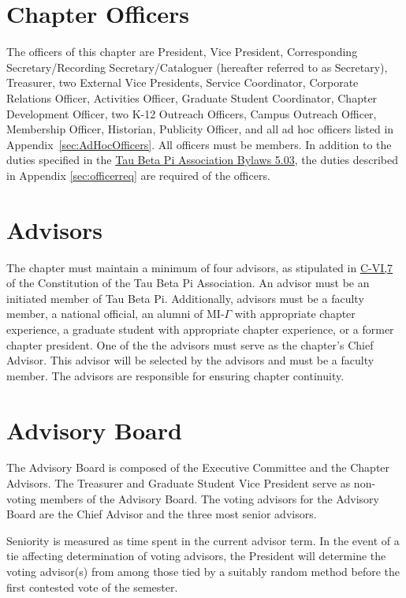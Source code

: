 \section{Chapter Officers} The officers of this chapter are  President, Vice President, Corresponding Secretary/Recording Secretary/Cataloguer 
(hereafter referred to as Secretary), Treasurer, two External Vice Presidents,
 Service Coordinator, Corporate Relations Officer, Activities Officer,  Graduate Student Coordinator, Chapter Development Officer, two K-12 Outreach
 Officers, Campus Outreach Officer, Membership Officer, 
Historian, Publicity Officer, and all ad hoc officers listed in Appendix~\ref{sec:AdHocOfficers}.  All officers must be  members. In addition to the duties specified in the \href{http://www.tbp.org/off/ConstBylaw.pdf}{Tau Beta Pi Association Bylaws 5.03}, the duties described in Appendix \ref{sec:officerreq} are required of the officers.

\section{Advisors}\label{sec:advisors} The chapter must maintain a minimum of four advisors, as stipulated in \href{http://www.tbp.org/off/ConstBylaw.pdf}{C-VI,7} of the Constitution of the Tau Beta Pi Association. An advisor must be an initiated member of Tau Beta Pi. Additionally, advisors must be a faculty member, %
a national official, %
an alumni of MI-$\Gamma$ with appropriate chapter experience, a graduate student with appropriate chapter experience, or a former chapter president. One of the the advisors must serve as the chapter's Chief Advisor. This advisor will be selected by the advisors and must be a faculty member. The advisors are responsible for ensuring chapter continuity.

\section{Advisory Board}\label{sec:advbrd} The Advisory Board is composed of the Executive Committee and the Chapter Advisors.  The Treasurer and Graduate Student Vice President serve as  non-voting members of the Advisory Board. The voting advisors for the Advisory Board are the Chief Advisor and the three most senior advisors.
\begin{enumsubsection}
\itemnotoc Seniority is measured as time spent in the current advisor term.
\itemnotoc In the event of a tie affecting determination of voting advisors, the President will determine the voting advisor(s) from among those tied by a suitably random method before the first contested vote of the semester.
\end{enumsubsection}

